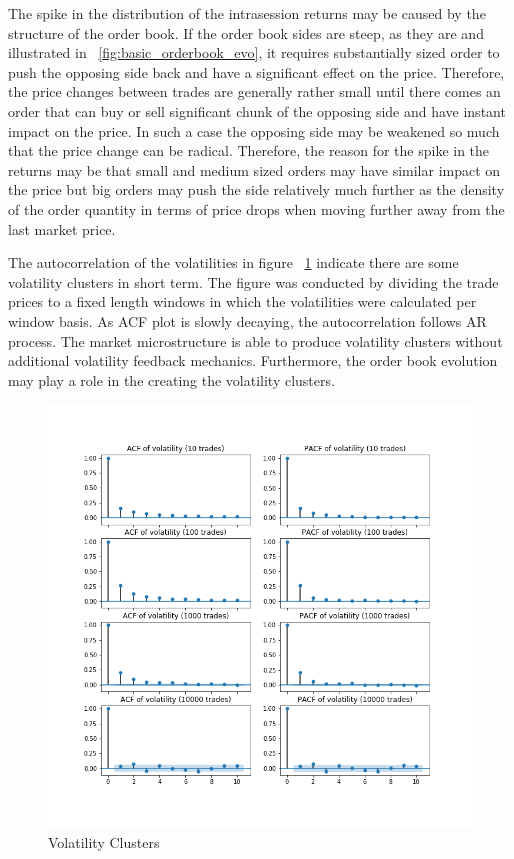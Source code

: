 The spike in the distribution of the intrasession returns may be caused by the structure of the order book. If the order book 
sides are steep, as they are and illustrated in ~\ref{fig:basic_orderbook_evo}, it requires substantially sized 
order to push the opposing side back and have a significant effect on the price. Therefore, the price changes between trades 
are generally rather small until there comes an order that can buy or sell significant chunk of the opposing side and have 
instant impact on the price. In such a case the opposing side may be weakened so much that the price change can be radical. 
Therefore, the reason for the spike in the returns may be that small and medium sized orders may have similar impact on the 
price but big orders may push the side relatively much further as the density of the order quantity in terms of price drops 
when moving further away from the last market price.

The autocorrelation of the volatilities in figure ~\ref{fig:basic_volaclusters}
indicate there are some volatility clusters in short term. The figure was conducted by
dividing the trade prices to a fixed length windows in which the volatilities were calculated per
window basis. As ACF plot is slowly decaying, the autocorrelation follows AR process. The market 
microstructure is able to produce volatility clusters without additional volatility feedback mechanics.
Furthermore, the order book evolution may play a role in the creating the volatility clusters.

\begin{figure}
    \includegraphics[width=\linewidth]{plots/basic_volaclusters_intra.png}
    \caption{Volatility Clusters}
    \label{fig:basic_volaclusters}
\end{figure}

